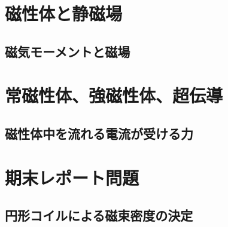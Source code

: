 \documentclass[uplatex,dvipdfmx,a4paper,11pt]{jlreq}
\theoremstyle{definition}
\begin{document}
\section{磁性体と静磁場}
\setcounter{subsection}{4}
\subsection{磁気モーメントと磁場}

\section{常磁性体、強磁性体、超伝導}
\subsection{磁性体中を流れる電流が受ける力}

\setcounter{section}{8}
\section{期末レポート問題}
\subsection{円形コイルによる磁束密度の決定}
\end{document}
